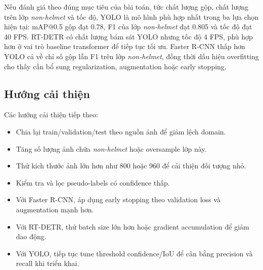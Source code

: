 Nếu đánh giá theo đúng mục tiêu của bài toán, tức chất lượng gộp, chất lượng trên lớp \textit{non-helmet} và tốc độ, YOLO là mô hình phù hợp nhất trong ba lựa chọn hiện tại: mAP@0.5 gộp đạt 0.78, F1 của lớp \textit{non-helmet} đạt 0.805 và tốc độ đạt 40 FPS. RT-DETR có chất lượng bám sát YOLO nhưng tốc độ 4 FPS, phù hợp hơn ở vai trò baseline transformer để tiếp tục tối ưu. Faster R-CNN thấp hơn YOLO cả về chỉ số gộp lẫn F1 trên lớp \textit{non-helmet}, đồng thời dấu hiệu overfitting cho thấy cần bổ sung regularization, augmentation hoặc early stopping.

\subsection{Hướng cải thiện}

Các hướng cải thiện tiếp theo:

\begin{itemize}
    \item Chia lại train/validation/test theo nguồn ảnh để giảm lệch domain.
    \item Tăng số lượng ảnh chứa \textit{non-helmet} hoặc oversample lớp này.
    \item Thử kích thước ảnh lớn hơn như 800 hoặc 960 để cải thiện đối tượng nhỏ.
    \item Kiểm tra và lọc pseudo-labels có confidence thấp.
    \item Với Faster R-CNN, áp dụng early stopping theo validation loss và augmentation mạnh hơn.
    \item Với RT-DETR, thử batch size lớn hơn hoặc gradient accumulation để giảm dao động.
    \item Với YOLO, tiếp tục tune threshold confidence/IoU để cân bằng precision và recall khi triển khai.
\end{itemize}
